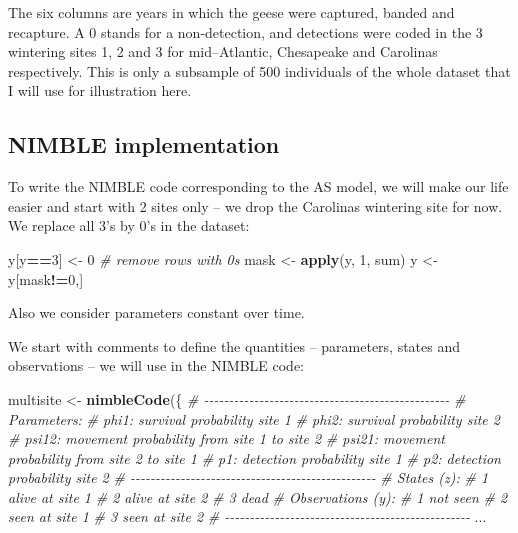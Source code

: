 \documentclass[
  12pt,
]{krantz}
\newenvironment{Shaded}{\begin{snugshade}}{\end{snugshade}}
\newcommand{\CommentTok}[1]{\textcolor[rgb]{0.56,0.35,0.01}{\textit{#1}}}
\newcommand{\DecValTok}[1]{\textcolor[rgb]{0.00,0.00,0.81}{#1}}
\newcommand{\FunctionTok}[1]{\textcolor[rgb]{0.13,0.29,0.53}{\textbf{#1}}}
\newcommand{\NormalTok}[1]{#1}
\newcommand{\OtherTok}[1]{\textcolor[rgb]{0.56,0.35,0.01}{#1}}
\newcommand{\SpecialCharTok}[1]{\textcolor[rgb]{0.81,0.36,0.00}{\textbf{#1}}}
\begin{document}
The six columns are years in which the geese were captured, banded and recapture. A 0 stands for a non-detection, and detections were coded in the 3 wintering sites 1, 2 and 3 for mid--Atlantic, Chesapeake and Carolinas respectively. This is only a subsample of 500 individuals of the whole dataset that I will use for illustration here.

\subsection{NIMBLE implementation}\label{nimble-implementation-1}

To write the NIMBLE code corresponding to the AS model, we will make our life easier and start with 2 sites only -- we drop the Carolinas wintering site for now. We replace all 3's by 0's in the dataset:

\begin{Shaded}
\begin{Highlighting}[]
\NormalTok{y[y}\SpecialCharTok{==}\DecValTok{3}\NormalTok{] }\OtherTok{\textless{}{-}} \DecValTok{0}
\CommentTok{\# remove rows with 0\textquotesingle{}s}
\NormalTok{mask }\OtherTok{\textless{}{-}} \FunctionTok{apply}\NormalTok{(y, }\DecValTok{1}\NormalTok{, sum)}
\NormalTok{y }\OtherTok{\textless{}{-}}\NormalTok{ y[mask}\SpecialCharTok{!=}\DecValTok{0}\NormalTok{,]}
\end{Highlighting}
\end{Shaded}

Also we consider parameters constant over time.

We start with comments to define the quantities -- parameters, states and observations -- we will use in the NIMBLE code:

\begin{Shaded}
\begin{Highlighting}[]
\NormalTok{multisite }\OtherTok{\textless{}{-}} \FunctionTok{nimbleCode}\NormalTok{(\{}
  \CommentTok{\# {-}{-}{-}{-}{-}{-}{-}{-}{-}{-}{-}{-}{-}{-}{-}{-}{-}{-}{-}{-}{-}{-}{-}{-}{-}{-}{-}{-}{-}{-}{-}{-}{-}{-}{-}{-}{-}{-}{-}{-}{-}{-}{-}{-}{-}{-}{-}{-}{-}}
  \CommentTok{\# Parameters:}
  \CommentTok{\# phi1: survival probability site 1}
  \CommentTok{\# phi2: survival probability site 2}
  \CommentTok{\# psi12: movement probability from site 1 to site 2}
  \CommentTok{\# psi21: movement probability from site 2 to site 1}
  \CommentTok{\# p1: detection probability site 1}
  \CommentTok{\# p2: detection probability site 2}
  \CommentTok{\# {-}{-}{-}{-}{-}{-}{-}{-}{-}{-}{-}{-}{-}{-}{-}{-}{-}{-}{-}{-}{-}{-}{-}{-}{-}{-}{-}{-}{-}{-}{-}{-}{-}{-}{-}{-}{-}{-}{-}{-}{-}{-}{-}{-}{-}{-}{-}{-}{-}}
  \CommentTok{\# States (z):}
  \CommentTok{\# 1 alive at site 1}
  \CommentTok{\# 2 alive at site 2}
  \CommentTok{\# 3 dead}
  \CommentTok{\# Observations (y):}
  \CommentTok{\# 1 not seen}
  \CommentTok{\# 2 seen at site 1}
  \CommentTok{\# 3 seen at site 2}
  \CommentTok{\# {-}{-}{-}{-}{-}{-}{-}{-}{-}{-}{-}{-}{-}{-}{-}{-}{-}{-}{-}{-}{-}{-}{-}{-}{-}{-}{-}{-}{-}{-}{-}{-}{-}{-}{-}{-}{-}{-}{-}{-}{-}{-}{-}{-}{-}{-}{-}{-}{-}}
\NormalTok{...}
\end{Highlighting}
\end{Shaded}
\end{document}
